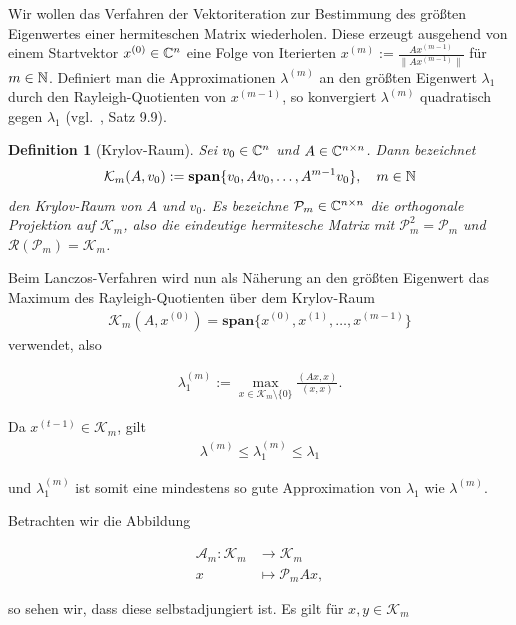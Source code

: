 \documentclass{article}
\theoremstyle{plain}
\newtheorem{definition} [theorem]{Definition}
\begin{document}
Wir wollen das Verfahren der Vektoriteration zur Bestimmung des größten Eigenwertes einer hermiteschen Matrix wiederholen. Diese erzeugt ausgehend von einem Startvektor $x^{(0)} \in \mathbb{C}^{n}$ eine Folge von Iterierten $x^{(m)} := \frac{Ax^{(m-1)}}{\|Ax^{(m-1)}\|}$ für $m \in \mathbb{N}$. Definiert man die Approximationen $\lambda^{(m)}$ an den größten Eigenwert $\lambda_1$ durch den Rayleigh-Quotienten von $x^{(m-1)}$, so konvergiert $\lambda^{(m)}$ quadratisch gegen $\lambda_1$ (vgl.\ \cite{Num}, Satz 9.9).

\begin{definition}[Krylov-Raum]
	Sei $v_0 \in \mathbb{C}^{n}$ und $A \in \mathbb{C}^{n \times n}$. Dann bezeichnet
	\begin{align*}
		\mathcal{K}_m(A,v_0) := \textbf{span}\{v_0, Av_0, \dots, A^{m-1}v_0\}, \quad m \in \mathbb{N}
	\end{align*}
	den Krylov-Raum von $A$ und $v_0$. Es bezeichne $\mathcal{P}_m \in \mathbb{C}^{n \times n}$ die orthogonale Projektion auf $\mathcal{K}_m$, also die eindeutige hermitesche Matrix mit $\mathcal{P}_m^2 = \mathcal{P}_m$ und $\mathcal{R}(\mathcal{P}_m) = \mathcal{K}_m$.
\end{definition}

Beim Lanczos-Verfahren wird nun als Näherung an den größten Eigenwert das Maximum des Rayleigh-Quotienten über dem Krylov-Raum
\begin{align*}
	\mathcal{K}_m(A,x^{(0)}) = \textbf{span}\{x^{(0)}, x^{(1)}, \dots , x^{(m-1)} \}
\end{align*}
verwendet, also

\begin{align*}
	\lambda_1^{(m)} := \max_{x \in \mathcal{K}_m \setminus \{0\}} \frac{(Ax,x)}{(x,x)}.
\end{align*}

Da $x^{(t-1)} \in \mathcal{K}_m$, gilt
\begin{align*}
	\lambda^{(m)} \leq \lambda_1^{(m)} \leq \lambda_1
\end{align*}

und $\lambda_1^{(m)}$ ist somit eine mindestens so gute Approximation von $\lambda_1$ wie $\lambda^{(m)}$.

Betrachten wir die Abbildung

\begin{align*}
	\mathcal{A}_m: \mathcal{K}_m &\to \mathcal{K}_m \\
	x &\mapsto \mathcal{P}_m Ax,
\end{align*}

so sehen wir, dass diese selbstadjungiert ist. Es gilt für $x,y \in \mathcal{K}_m$
\end{document}
